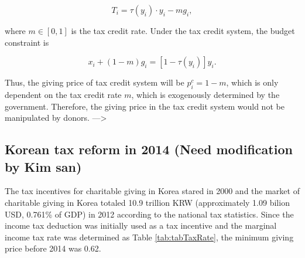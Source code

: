 \documentclass[ review  , 3p ]{elsarticle}
\begin{document}
  \[
      T_i = \tau(y_i)\cdot y_i - m g_i,
  \]
  
  where \(m \in [0, 1]\) is the tax credit rate. Under the tax credit system, the budget constraint is
  
  \[
      x_i + (1 - m) g_i = [1 - \tau(y_i)] y_i.
  \]
  
  Thus, the giving price of tax credit system will be \(p_i^c = 1 - m\), which is only dependent on the tax credit rate \(m\), which is exogenously determined by the government.
  Therefore, the giving price in the tax credit system would not be manipulated by donors.
  ---\textgreater{}
  
  \hypertarget{korean-tax-reform-in-2014-need-modification-by-kim-san}{%
  \subsection{Korean tax reform in 2014 (Need modification by Kim san)}\label{korean-tax-reform-in-2014-need-modification-by-kim-san}}
  
  The tax incentives for charitable giving in Korea stared in 2000 and the market of charitable giving in Korea totaled 10.9 trillion KRW (approximately 1.09 bilion USD, 0.761\% of GDP) in 2012 according to the national tax statistics.
  Since the income tax deduction was initially used as a tax incentive and the marginal income tax rate was determined as Table \ref{tab:tabTaxRate}, the minimum giving price before 2014 was 0.62.
  
\end{document}
